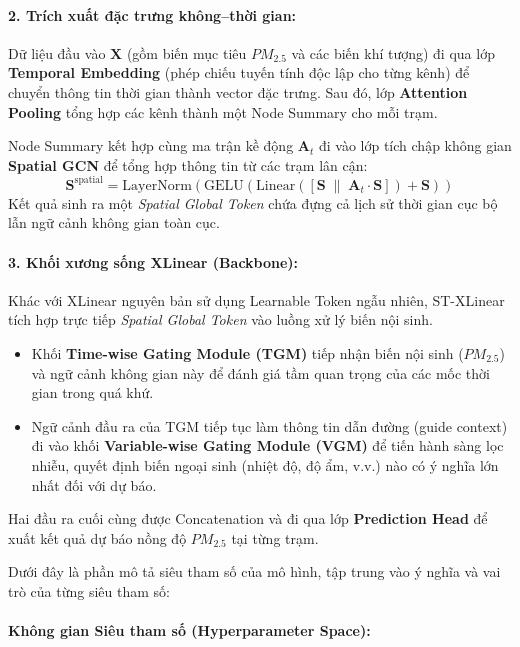 \paragraph{2. Trích xuất đặc trưng không--thời gian:}
Dữ liệu đầu vào $\mathbf{X}$ (gồm biến mục tiêu $PM_{2.5}$ và các biến khí tượng) đi qua lớp \textbf{Temporal Embedding} (phép chiếu tuyến tính độc lập cho từng kênh) để chuyển thông tin thời gian thành vector đặc trưng. Sau đó, lớp \textbf{Attention Pooling} tổng hợp các kênh thành một Node Summary cho mỗi trạm.

Node Summary kết hợp cùng ma trận kề động $\mathbf{A}_t$ đi vào lớp tích chập không gian \textbf{Spatial GCN} để tổng hợp thông tin từ các trạm lân cận:
\begin{equation}
    \mathbf{S}^{\text{spatial}} = \text{LayerNorm}\left(\text{GELU}\left(\text{Linear}\left([\mathbf{S} \;\|\; \mathbf{A}_t \cdot \mathbf{S}]\right) + \mathbf{S}\right)\right)
\end{equation}
Kết quả sinh ra một \textit{Spatial Global Token} chứa đựng cả lịch sử thời gian cục bộ lẫn ngữ cảnh không gian toàn cục.

\paragraph{3. Khối xương sống XLinear (Backbone):}
Khác với XLinear nguyên bản sử dụng Learnable Token ngẫu nhiên, ST-XLinear tích hợp trực tiếp \textit{Spatial Global Token} vào luồng xử lý biến nội sinh. 
\begin{itemize}
    \item Khối \textbf{Time-wise Gating Module (TGM)} tiếp nhận biến nội sinh ($PM_{2.5}$) và ngữ cảnh không gian này để đánh giá tầm quan trọng của các mốc thời gian trong quá khứ.
    \item Ngữ cảnh đầu ra của TGM tiếp tục làm thông tin dẫn đường (guide context) đi vào khối \textbf{Variable-wise Gating Module (VGM)} để tiến hành sàng lọc nhiễu, quyết định biến ngoại sinh (nhiệt độ, độ ẩm, v.v.) nào có ý nghĩa lớn nhất đối với dự báo.
\end{itemize}
Hai đầu ra cuối cùng được Concatenation và đi qua lớp \textbf{Prediction Head} để xuất kết quả dự báo nồng độ $PM_{2.5}$ tại từng trạm.

Dưới đây là phần mô tả siêu tham số của mô hình, tập trung vào ý nghĩa và vai trò của từng siêu tham số:

\paragraph{Không gian Siêu tham số (Hyperparameter Space):}

